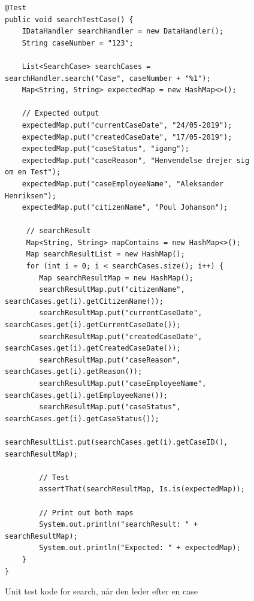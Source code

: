 \begin{figure}
\begin{lstlisting}
@Test
public void searchTestCase() {
	IDataHandler searchHandler = new DataHandler();
	String caseNumber = "123";
	
	List<SearchCase> searchCases = searchHandler.search("Case", caseNumber + "%1");
	Map<String, String> expectedMap = new HashMap<>();
	
	// Expected output
	expectedMap.put("currentCaseDate", "24/05-2019");
	expectedMap.put("createdCaseDate", "17/05-2019");
	expectedMap.put("caseStatus", "igang");
	expectedMap.put("caseReason", "Henvendelse drejer sig om en Test");
	expectedMap.put("caseEmployeeName", "Aleksander Henriksen");
	expectedMap.put("citizenName", "Poul Johanson");
	
	 // searchResult
	 Map<String, String> mapContains = new HashMap<>();
	 Map searchResultList = new HashMap();
	 for (int i = 0; i < searchCases.size(); i++) {
	 	Map searchResultMap = new HashMap();
	 	searchResultMap.put("citizenName", searchCases.get(i).getCitizenName());
	 	searchResultMap.put("currentCaseDate", searchCases.get(i).getCurrentCaseDate());
	 	searchResultMap.put("createdCaseDate", searchCases.get(i).getCreatedCaseDate());
	 	searchResultMap.put("caseReason", searchCases.get(i).getReason());
	 	searchResultMap.put("caseEmployeeName", searchCases.get(i).getEmployeeName());
	 	searchResultMap.put("caseStatus", searchCases.get(i).getCaseStatus());
	 	searchResultList.put(searchCases.get(i).getCaseID(), searchResultMap);
	 	
	 	// Test
	 	assertThat(searchResultMap, Is.is(expectedMap));
	 	
	 	// Print out both maps
	 	System.out.println("searchResult: " + searchResultMap);
	 	System.out.println("Expected: " + expectedMap);
	}
}
\end{lstlisting}
\caption{Unit test kode for search, når den leder efter en case}
\label{kode:searchcase}
\end{figure}
